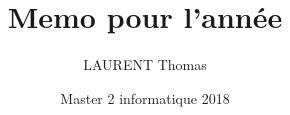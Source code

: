 \documentclass[french, 12pt]{report}
\title{Memo pour l'année}
\author{LAURENT Thomas}
\date{Master 2 informatique 2018}
\begin{document}
\maketitle
\pagebreak
\tableofcontents

\begin{titlepage}
\end{titlepage}
\pagebreak








\end{document}
